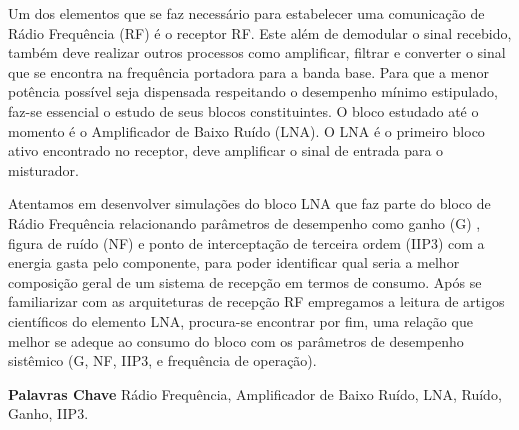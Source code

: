 Um dos elementos que se faz necessário para estabelecer uma comunicação de  Rádio Frequência (RF) é o receptor RF. Este além de demodular o sinal recebido, também deve realizar outros processos como amplificar, filtrar e converter o sinal que se encontra na frequência portadora para a banda base. Para que a menor potência possível seja dispensada respeitando o desempenho mínimo estipulado, faz-se essencial o estudo de seus blocos constituintes. O bloco estudado até o momento é o Amplificador de Baixo Ruído (LNA). O LNA é o primeiro bloco ativo encontrado no receptor, deve amplificar o sinal de entrada para o misturador.

Atentamos em desenvolver simulações do bloco LNA que faz parte do bloco de Rádio Frequência relacionando parâmetros de desempenho como ganho (G) , figura de ruído (NF) e ponto de interceptação de terceira ordem (IIP3)  com a energia gasta pelo componente, para poder identificar qual seria a melhor composição geral de um sistema de recepção em termos de consumo. Após se familiarizar com as arquiteturas de recepção RF empregamos a leitura de artigos científicos do elemento LNA, procura-se encontrar por fim, uma relação que melhor se adeque ao consumo do bloco com os parâmetros de desempenho sistêmico (G, NF, IIP3, e frequência de operação). 

\hfill \break

\noindent \textbf{Palavras Chave} Rádio Frequência, Amplificador de Baixo Ruído, LNA, Ruído, Ganho, IIP3.
